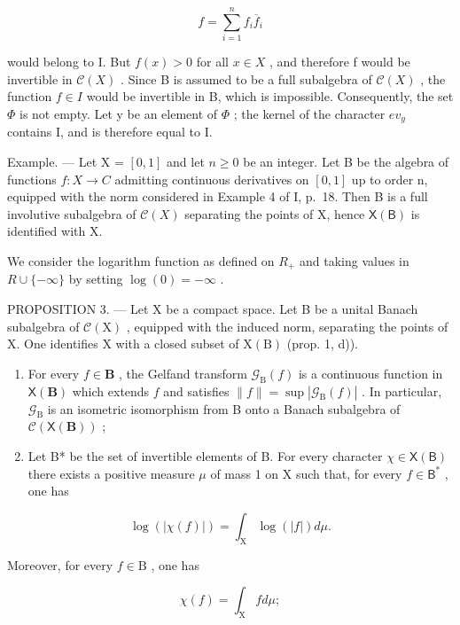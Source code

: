 \[
f = \sum_ {i = 1} ^ {n} f _ {i} \overline {{f}} _ {i}
\]

would belong to I. But \(f(x) > 0\) for all \(x \in X\) , and therefore f would be invertible in \(\mathcal{C}(X)\) . Since B is assumed to be a full subalgebra of \(\mathcal{C}(X)\) , the function \(f \in I\) would be invertible in B, which is impossible. Consequently, the set \(\Phi\) is not empty. Let y be an element of \(\Phi\) ; the kernel of the character \(ev_{y}\) contains I, and is therefore equal to I.

Example. --- Let X = \([0,1]\) and let \(n \geqslant 0\) be an integer. Let B be the algebra of functions \(f: X \to C\) admitting continuous derivatives on \([0,1]\) up to order n, equipped with the norm considered in Example 4 of I, p.~18. Then B is a full involutive subalgebra of \(\mathcal{C}(X)\) separating the points of X, hence \(\mathsf{X}(\mathsf{B})\) is identified with X.

We consider the logarithm function as defined on \(R_{+}\) and taking values in \(R \cup \{-\infty\}\) by setting \(\log(0) = -\infty\) .

PROPOSITION 3. --- Let X be a compact space. Let B be a unital Banach subalgebra of \(\mathcal{C}(\mathrm{X})\) , equipped with the induced norm, separating the points of X. One identifies X with a closed subset of \(\mathrm{X(B)}\) (prop. 1, d)).

\begin{enumerate}
\def\labelenumi{\alph{enumi})}
\item
  For every \(f \in \mathbf{B}\) , the Gelfand transform \(\mathcal{G}_{\mathrm{B}}(f)\) is a continuous function in \(\mathsf{X}(\mathbf{B})\) which extends \(f\) and satisfies \(\| f \| = \sup |\mathcal{G}_{\mathrm{B}}(f)|\) . In particular, \(\mathcal{G}_{\mathrm{B}}\) is an isometric isomorphism from B onto a Banach subalgebra of \(\mathcal{C}(\mathsf{X}(\mathbf{B}))\) ;
\item
  Let B* be the set of invertible elements of B. For every character \(\chi \in \mathsf{X}(\mathsf{B})\) there exists a positive measure \(\mu\) of mass 1 on X such that, for every \(f \in \mathsf{B}^*\) , one has
\end{enumerate}

\[
\log (| \chi (f) |) = \int_ {\mathrm{X}} \log (| f |) d \mu .
\]

Moreover, for every \(f \in \mathrm{B}\) , one has

\[
\chi (f) = \int_ {\mathrm{X}} f d \mu ;
\]

